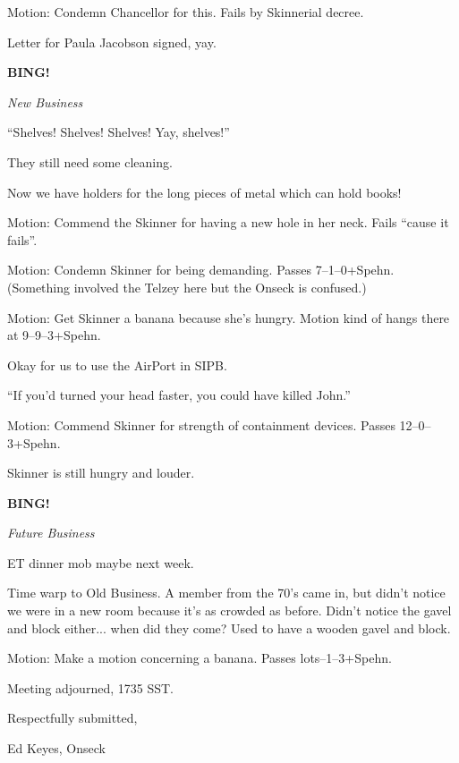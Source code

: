 \documentclass[12pt]{article}
\newcommand{\bing}{{\bf BING!} }
\newcommand{\goto}[1]{\bing \vskip 12pt \centerline{{\em{#1}}}}
\begin{document}
Motion: Condemn Chancellor for this.  Fails by Skinnerial decree.

Letter for Paula Jacobson signed, yay.


\goto{New Business}

``Shelves!  Shelves!  Shelves!  Yay, shelves!''

They still need some cleaning.

Now we have holders for the long pieces of metal which can hold books!

Motion: Commend the Skinner for having a new hole in her neck.  Fails
``cause it fails''.

Motion: Condemn Skinner for being demanding.  Passes 7--1--0+Spehn.
(Something involved the Telzey here but the Onseck is confused.)

Motion: Get Skinner a banana because she's hungry.  Motion kind of
hangs there at 9--9--3+Spehn.

Okay for us to use the AirPort in SIPB.

``If you'd turned your head faster, you could have killed John.''

Motion: Commend Skinner for strength of containment devices.  Passes
12--0--3+Spehn.

Skinner is still hungry and louder.

\goto{Future Business}

ET dinner mob maybe next week.

Time warp to Old Business.  A member from the 70's came in, but didn't
notice we were in a new room because it's as crowded as before.  Didn't
notice the gavel and block either... when did they come?  Used to have
a wooden gavel and block.

Motion: Make a motion concerning a banana.  Passes lots--1--3+Spehn.

\vspace{12pt}

\noindent
Meeting adjourned, 1735 SST.

\vspace{18pt}

\centerline{Respectfully submitted,}
\centerline{Ed Keyes, Onseck}
\end{document}
